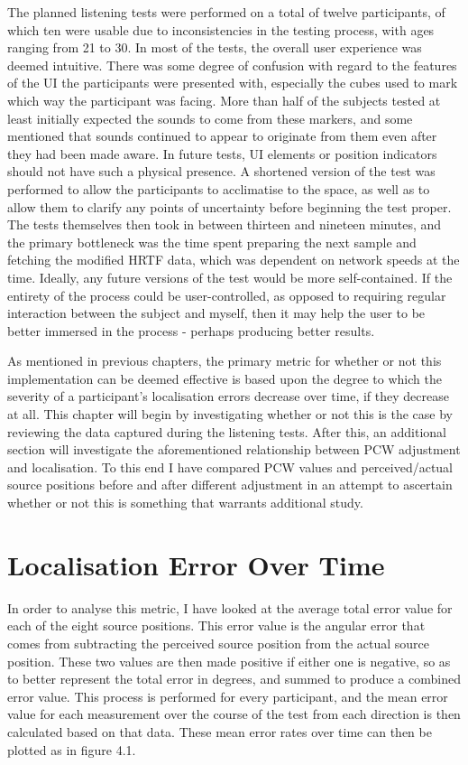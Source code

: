 The planned listening tests were performed on a total of twelve participants, of which ten were usable due to inconsistencies in the testing process, with ages ranging from 21 to 30. In most of the tests, the overall user experience was deemed intuitive. There was some degree of confusion with regard to the features of the UI the participants were presented with, especially the cubes used to mark which way the participant was facing. More than half of the subjects tested at least initially expected the sounds to come from these markers, and some mentioned that sounds continued to appear to originate from them even after they had been made aware. In future tests, UI elements or position indicators should not have such a physical presence. A shortened version of the test was performed to allow the participants to acclimatise to the space, as well as to allow them to clarify any points of uncertainty before beginning the test proper. The tests themselves then took in between thirteen and nineteen minutes, and the primary bottleneck was the time spent preparing the next sample and fetching the modified HRTF data, which was dependent on network speeds at the time. Ideally, any future versions of the test would be more self-contained. If the entirety of the process could be user-controlled, as opposed to requiring regular interaction between the subject and myself, then it may help the user to be better immersed in the process - perhaps producing better results. 

As mentioned in previous chapters, the primary metric for whether or not this implementation can be deemed effective is based upon the degree to which the severity of a participant's localisation errors decrease over time, if they decrease at all. This chapter will begin by investigating whether or not this is the case by reviewing the data captured during the listening tests. After this, an additional section will investigate the aforementioned relationship between PCW adjustment and localisation. To this end I have compared PCW values and perceived/actual source positions before and after different adjustment in an attempt to ascertain whether or not this is something that warrants additional study.	

\section{Localisation Error Over Time}
In order to analyse this metric, I have looked at the average total error value for each of the eight source positions. This error value is the angular error that comes from subtracting the perceived source position from the actual source position. These two values are then made positive if either one is negative, so as to better represent the total error in degrees, and summed to produce a combined error value. This process is performed for every participant, and the mean error value for each measurement over the course of the test from each direction is then calculated based on that data. These mean error rates over time can then be plotted as in figure 4.1. 

